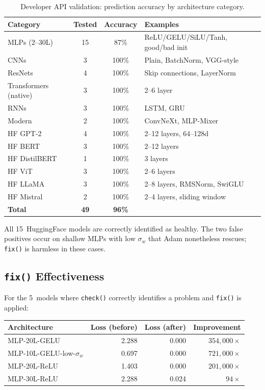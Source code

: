 \documentclass[10pt]{article}
\begin{document}
\begin{table}[h]
\centering
\caption{Developer API validation: prediction accuracy by architecture category.}
\label{tab:developer-validation}
\begin{tabular}{l c c l}
\toprule
Category & Tested & Accuracy & Examples \\
\midrule
MLPs (2--30L) & 15 & 87\% & ReLU/GELU/SiLU/Tanh, good/bad init \\
CNNs & 3 & 100\% & Plain, BatchNorm, VGG-style \\
ResNets & 4 & 100\% & Skip connections, LayerNorm \\
Transformers (native) & 3 & 100\% & 2--6 layer \\
RNNs & 3 & 100\% & LSTM, GRU \\
Modern & 2 & 100\% & ConvNeXt, MLP-Mixer \\
\midrule
HF GPT-2 & 4 & 100\% & 2--12 layers, 64--128d \\
HF BERT & 3 & 100\% & 2--12 layers \\
HF DistilBERT & 1 & 100\% & 3 layers \\
HF ViT & 3 & 100\% & 2--6 layers \\
HF LLaMA & 3 & 100\% & 2--8 layers, RMSNorm, SwiGLU \\
HF Mistral & 2 & 100\% & 2--4 layers, sliding window \\
\midrule
\textbf{Total} & \textbf{49} & \textbf{96\%} & \\
\bottomrule
\end{tabular}
\end{table}

All 15~HuggingFace models are correctly identified as healthy. The two false positives occur on shallow MLPs with low $\sigma_w$ that Adam nonetheless rescues; \texttt{fix()} is harmless in these cases.

\subsection{\texttt{fix()} Effectiveness}

For the 5~models where \texttt{check()} correctly identifies a problem and \texttt{fix()} is applied:

\begin{center}
\begin{tabular}{l r r r}
\toprule
Architecture & Loss (before) & Loss (after) & Improvement \\
\midrule
MLP-20L-GELU & 2.288 & 0.000 & $354{,}000\times$ \\
MLP-10L-GELU-low-$\sigma_w$ & 0.697 & 0.000 & $721{,}000\times$ \\
MLP-20L-ReLU & 1.403 & 0.000 & $201{,}000\times$ \\
MLP-30L-ReLU & 2.288 & 0.024 & $94\times$ \\
\bottomrule
\end{tabular}
\end{center}
\end{document}
